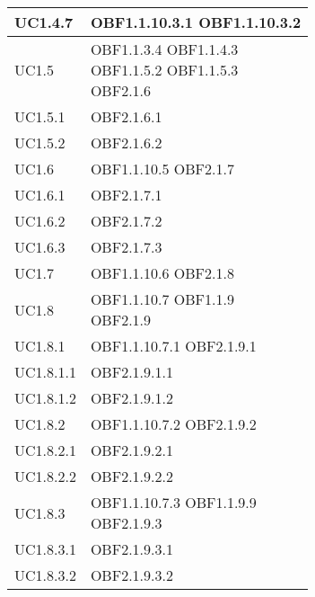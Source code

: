 \documentclass{scalatekids-article}
\begin{document}
\begin{longtable}[H]{|p{5.5cm}|p{5.5cm}|}
\hline
UC1.4.7 & \multiLineCell[t]{OBF1.1.10.3.1 OBF1.1.10.3.2\\}\\
\hline
UC1.5 & \multiLineCell[t]{OBF1.1.3.4 OBF1.1.4.3\\OBF1.1.5.2 OBF1.1.5.3\\OBF2.1.6}\\
\hline
UC1.5.1 & \multiLineCell[t]{OBF2.1.6.1\\}\\
\hline
UC1.5.2 & \multiLineCell[t]{OBF2.1.6.2\\}\\
\hline
UC1.6 & \multiLineCell[t]{OBF1.1.10.5 OBF2.1.7\\}\\
\hline
UC1.6.1 & \multiLineCell[t]{OBF2.1.7.1\\}\\
\hline
UC1.6.2 & \multiLineCell[t]{OBF2.1.7.2\\}\\
\hline
UC1.6.3 & \multiLineCell[t]{OBF2.1.7.3\\}\\
\hline
UC1.7 & \multiLineCell[t]{OBF1.1.10.6 OBF2.1.8\\}\\
\hline
UC1.8 & \multiLineCell[t]{OBF1.1.10.7 OBF1.1.9\\OBF2.1.9}\\
\hline
UC1.8.1 & \multiLineCell[t]{OBF1.1.10.7.1 OBF2.1.9.1\\}\\
\hline
UC1.8.1.1 & \multiLineCell[t]{OBF2.1.9.1.1\\}\\
\hline
UC1.8.1.2 & \multiLineCell[t]{OBF2.1.9.1.2\\}\\
\hline
UC1.8.2 & \multiLineCell[t]{OBF1.1.10.7.2 OBF2.1.9.2\\}\\
\hline
UC1.8.2.1 & \multiLineCell[t]{OBF2.1.9.2.1\\}\\
\hline
UC1.8.2.2 & \multiLineCell[t]{OBF2.1.9.2.2\\}\\
\hline
UC1.8.3 & \multiLineCell[t]{OBF1.1.10.7.3 OBF1.1.9.9\\OBF2.1.9.3}\\
\hline
UC1.8.3.1 & \multiLineCell[t]{OBF2.1.9.3.1\\}\\
\hline
UC1.8.3.2 & \multiLineCell[t]{OBF2.1.9.3.2\\}\\

\end{longtable}
\end{document}
